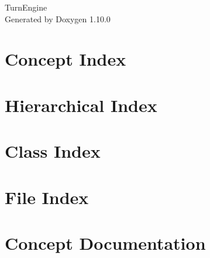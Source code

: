 \documentclass[twoside]{book}
\newcommand{\+}{\discretionary{\mbox{\scriptsize$\hookleftarrow$}}{}{}}
\newcommand{\clearemptydoublepage}{%
    \newpage{\pagestyle{empty}\cleardoublepage}%
  }
\begin{document}
  \raggedbottom
    \hypersetup{pageanchor=false,
                bookmarksnumbered=true,
                pdfencoding=unicode
               }
  \begin{titlepage}
  \vspace*{7cm}
  \begin{center}%
  {\Large Turn\+Engine}\\
  \vspace*{1cm}
  {\large Generated by Doxygen 1.10.0}\\
  \end{center}
  \end{titlepage}
  \clearemptydoublepage
  \tableofcontents
  \clearemptydoublepage
  \hypersetup{pageanchor=true}
\chapter{Concept Index}

\chapter{Hierarchical Index}

\chapter{Class Index}

\chapter{File Index}

\chapter{Concept Documentation}




\end{document}
